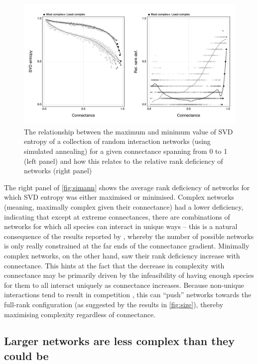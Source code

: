 \begin{refsection}
\begin{figure}[h]
    \centering
    \includegraphics[width=\textwidth]{figures/minmax_combined.png}
    \caption{The relationship between the maximum and minimum value of SVD
entropy of a collection of random interaction networks (using simulated
annealing) for a given connectance spanning from 0 to 1 (left panel) and how
this relates to the relative rank deficiency of networks (right panel)}
    \label{fig:simann}
\end{figure}

The right panel of \autoref{fig:simann} shows the average rank deficiency of
networks for which SVD entropy was either maximised or minimised. Complex
networks (meaning, maximally complex given their connectance) had a lower
deficiency, indicating that except at extreme connectances, there are
combinations of networks for which all species can interact in unique ways --
this is a natural consequence of the results reported by
\cite{Poisot2014WheEco}, whereby the number of possible networks is only
really constrained at the far ends of the connectance gradient. Minimally
complex networks, on the other hand, saw their rank deficiency increase with
connectance. This hints at the fact that the decrease in complexity with
connectance may be primarily driven by the infeasibility of having enough
species for them to all interact uniquely as connectance increases. Because
non-unique interactions tend to result in competition
\cite{Bascompte2007PlaMut}, this can ``push'' networks towards the full-rank
configuration (as suggested by the results in \autoref{fig:size}), thereby
maximising complexity regardless of connectance.

\subsection{Larger networks are less complex than they could
be}\label{larger-networks-are-less-complex-than-they-could-be}


\end{refsection}

